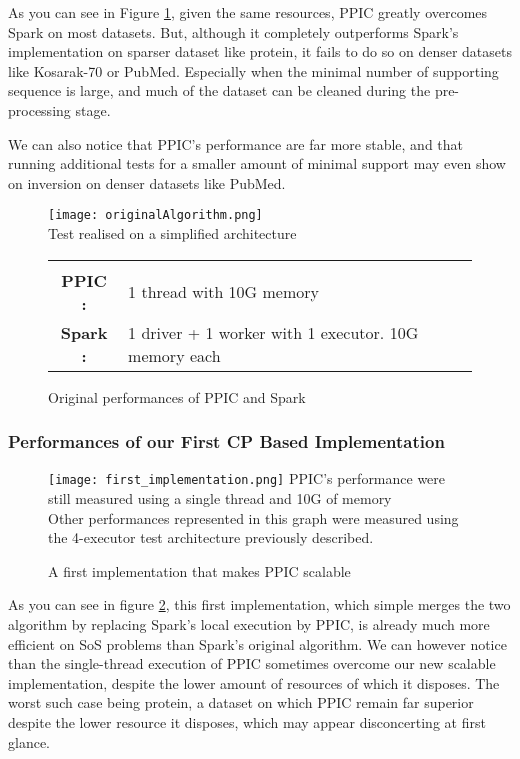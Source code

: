 \documentclass{eplmastersthesis}
\newcommand\danger{%
 \makebox[1.4em][c]{%
 \makebox[0pt][c]{\raisebox{.1em}{\small!}}%
 \makebox[0pt][c]{\color{red}\Large$\bigtriangleup$}}}%
\begin{document}
As you can see in Figure \ref{fig:originalAlgorithmPerformances}, given the same resources, PPIC greatly overcomes Spark on most datasets. But, although it completely outperforms Spark's implementation on sparser dataset like protein, it fails to do so on denser datasets like Kosarak-70 or PubMed. Especially when the minimal number of supporting sequence is large, and much of the dataset can be cleaned during the pre-processing stage. \newline

We can also notice that PPIC's performance are far more stable, and that running additional tests for a smaller amount of minimal support may even show on inversion on denser datasets like PubMed.

\begin{figure}[h]
  \centering
  \texttt{[image: originalAlgorithm.png]} \\
  \danger  Test realised on a simplified architecture \danger \\
  \begin{tabular}{c l}
  	 & \\
  	\textbf{PPIC :} & 1 thread  with 10G memory \\
  	\textbf{Spark :} & 1 driver + 1 worker with 1 executor. 10G memory each
  \end{tabular}
  \caption{Original performances of PPIC and Spark}
  \label{fig:originalAlgorithmPerformances}
\end{figure}

\subsubsection{Performances of our First CP Based Implementation}

\begin{figure}[h]
  \centering
  \texttt{[image: first\_implementation.png]}
  \danger PPIC's performance were still measured using a single thread and 10G of memory \danger \\
  Other performances represented in this graph were measured using the 4-executor test architecture previously described.
  \caption{A first implementation that makes PPIC scalable}
  \label{fig:first_scalable_CPbased_implementation}
\end{figure}

As you can see in figure \ref{fig:first_scalable_CPbased_implementation}, this first implementation, which simple merges the two algorithm by replacing Spark's local execution by PPIC, is already much more efficient on \acrlong{SoS} problems than Spark's original algorithm. We can however notice than the single-thread execution of PPIC sometimes overcome our new scalable implementation, despite the lower amount of resources of which it disposes. The worst such case being protein, a dataset on which PPIC remain far superior despite the lower resource it disposes, which may appear disconcerting at first glance. \newline
\end{document}
